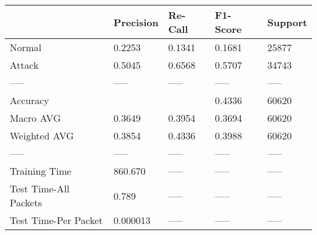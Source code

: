 \begin{tabular}{lllll}
\toprule
{} & Precision & Re-Call & F1-Score & Support \\
\midrule
Normal                &    0.2253 &  0.1341 &   0.1681 &   25877 \\
Attack                &    0.5045 &  0.6568 &   0.5707 &   34743 \\
-----                 &     ----- &   ----- &    ----- &   ----- \\
Accuracy              &           &         &   0.4336 &   60620 \\
Macro AVG             &    0.3649 &  0.3954 &   0.3694 &   60620 \\
Weighted AVG          &    0.3854 &  0.4336 &   0.3988 &   60620 \\
-----                 &     ----- &   ----- &    ----- &   ----- \\
Training Time         &   860.670 &   ----- &    ----- &   ----- \\
Test Time-All Packets &     0.789 &   ----- &    ----- &   ----- \\
Test Time-Per Packet  &  0.000013 &   ----- &    ----- &   ----- \\
\bottomrule
\end{tabular}
